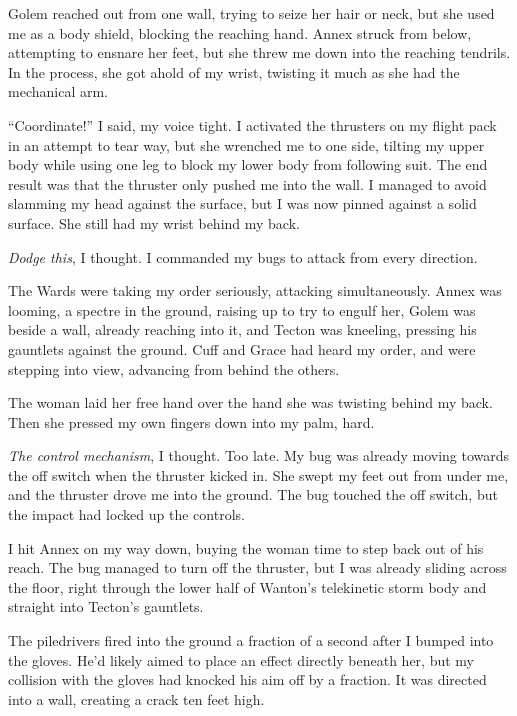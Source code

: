 Golem reached out from one wall, trying to seize her hair or neck, but she used me as a body shield, blocking the reaching hand.  Annex struck from below, attempting to ensnare her feet, but she threw me down into the reaching tendrils.  In the process, she got ahold of my wrist, twisting it much as she had the mechanical arm.



``Coordinate!'' I said, my voice tight.  I activated the thrusters on my flight pack in an attempt to tear way, but she wrenched me to one side, tilting my upper body while using one leg to block my lower body from following suit.  The end result was that the thruster only pushed me into the wall.  I managed to avoid slamming my head against the surface, but I was now pinned against a solid surface.  She still had my wrist behind my back.



\emph{Dodge this}, I thought.  I commanded my bugs to attack from every direction.



The Wards were taking my order seriously, attacking simultaneously.  Annex was looming, a spectre in the ground, raising up to try to engulf her, Golem was beside a wall, already reaching into it, and Tecton was kneeling, pressing his gauntlets against the ground.  Cuff and Grace had heard my order, and were stepping into view, advancing from behind the others.



The woman laid her free hand over the hand she was twisting behind my back.  Then she pressed my own fingers down into my palm, hard.



\emph{The control mechanism}, I thought.  Too late.  My bug was already moving towards the off switch when the thruster kicked in.  She swept my feet out from under me, and the thruster drove me into the ground.  The bug touched the off switch, but the impact had locked up the controls.



I hit Annex on my way down, buying the woman time to step back out of his reach.  The bug managed to turn off the thruster, but I was already sliding across the floor, right through the lower half of Wanton's telekinetic storm body and straight into Tecton's gauntlets.



The piledrivers fired into the ground a fraction of a second after I bumped into the gloves.  He'd likely aimed to place an effect directly beneath her, but my collision with the gloves had knocked his aim off by a fraction.  It was directed into a wall, creating a crack ten feet high.



